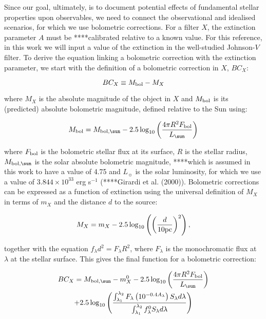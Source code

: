 \documentclass{mnras}
\begin{document}
Since our goal, ultimately, is to document potential effects of fundamental stellar properties upon observables, we need to connect the observational and idealised scenarios, for which we use bolometric corrections. For a filter $X$, the extinction parameter $A$ must be ****calibrated relative to a known value. For this reference, in this work we will input a value of the extinction in the well-studied Johnson-$V$ filter.
To derive the equation linking a bolometric correction with the extinction parameter, we start with the definition of a bolometric correction in $X$, $BC_{X}$:

\begin{equation}
BC_{X} \equiv M_{\textnormal{bol}} - M_{X}
\label{BC_def}
\end{equation}

where $M_{X}$ is the absolute magnitude of the object in $X$ and $M_{\textnormal{bol}}$ is its (predicted) absolute bolometric magnitude, defined relative to the Sun using:

\begin{equation}
M_{\textnormal{bol}} = M_{\textnormal{bol},\sun} - 2.5 \log_{10} \left( \frac{4\pi R^{2}F_{\textnormal{bol}}}{L_{\sun}} \right)
\label{mbol_sun}
\end{equation}

where  $F_{\textnormal{bol}}$ is the bolometric stellar flux at its surface, $R$ is the stellar radius, $M_{\textnormal{bol},\sun}$ is the solar absolute bolometric magnitude, ****which is assumed in this work to have a value of 4.75 and $L_{\sun}$ is the solar luminosity, for which we use a value of $3.844 \times 10^{33}$ erg s$^{-1}$ (****Girardi et al. (2000)). Bolometric corrections can be expressed as a function of extinction using the universal definition of $M_{X}$ in terms of $m_{X}$ and the distance $d$ to the source:

\begin{equation}
M_{X} = m_{X} - 2.5 \log_{10}\left( \left( \frac{d}{10 \textnormal{pc}} \right)^{2} \right),
\label{BC_def}
\end{equation}

together with the equation $f_{\lambda}d^{2}=F_{\lambda}R^{2}$, where $F_{\lambda}$ is the monochromatic flux at $\lambda$ at the stellar surface. This gives the final function for a bolometric correction:

\begin{multline}
BC_{X} = M_{\textnormal{bol},\sun} - m_{X}^{0} - 2.5 \log_{10} \left( \frac{4\pi R^{2}F_{\textnormal{bol}}}{L_{\sun}} \right) \\ + 2.5 \log_{10} \left( \frac{\int_{\lambda_{1}}^{\lambda_{2}} F_{\lambda} \left( 10^{-0.4 A_{\lambda}} \right) S_{\lambda} d\lambda}{\int_{\lambda_{1}}^{\lambda_{2}} f_{\lambda}^{0} S_{\lambda} d\lambda} \right)
\label{BC_extinc}
\end{multline}
\end{document}
